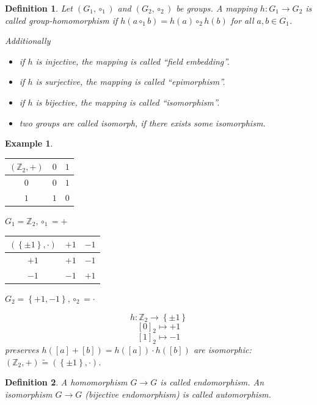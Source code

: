 \documentclass[a4paper,landscape,twocolumn]{article}
\newcommand\set[1]{\left\{#1\right\}}
\newtheorem{defi}{Definition}
\newtheorem{ex}{Example}
\begin{document}
\begin{defi}
  Let $(G_1, \circ_1)$ and $(G_2, \circ_2)$ be groups. A mapping $h: G_1 \rightarrow G_2$
  is called group-homomorphism if $h(a \circ_1 b) = h(a) \circ_2 h(b)$ for all $a, b \in G_1$.

  Additionally
  \begin{itemize}
    \item if $h$ is injective, the mapping is called \enquote{field embedding}.
    \item if $h$ is surjective, the mapping is called \enquote{epimorphism}.
    \item if $h$ is bijective, the mapping is called \enquote{isomorphism}.
    \item two groups are called isomorph, if there exists some isomorphism.
  \end{itemize}
\end{defi}

\begin{ex}
  \begin{tabular}{c|cc}
    $(\mathbb Z_2, +)$ & $0$ & $1$ \\
  \hline
                   $0$ & $0$ & $1$ \\
                   $1$ & $1$ & $0$
  \end{tabular}
  $G_1 = \mathbb Z_2, \circ_1 = +$
  \begin{tabular}{c|cc}
    $(\set{\pm 1}, \cdot)$ & $+1$ & $-1$ \\
  \hline
                      $+1$ & $+1$ & $-1$ \\
                      $-1$ & $-1$ & $+1$
  \end{tabular}
  $G_2 = \set{+1, -1}, \circ_2 = \cdot$

  \[ h: \mathbb Z_2 \rightarrow \set{\pm 1} \]
  \[ [0]_2 \mapsto +1 \]
  \[ [1]_2 \mapsto -1 \]
  preserves $h([a] + [b]) = h([a]) \cdot h([b])$ are isomorphic: $(\mathbb{Z}_2, +) \tilde{=} (\set{\pm 1}, \cdot)$.
\end{ex}

\begin{defi}
  A homomorphism $G \rightarrow G$ is called \emph{endomorphism}.
  An isomorphism $G \rightarrow G$ (bijective endomorphism) is called \emph{automorphism}.
\end{defi}
\end{document}
